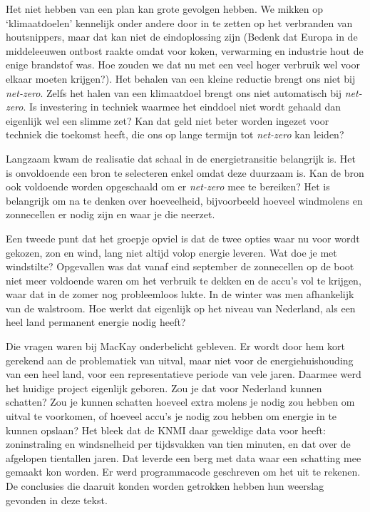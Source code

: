 \documentclass[
  11pt,
  a4paper,
]{book}
\begin{document}
Het niet hebben van een plan kan grote gevolgen hebben. We mikken op `klimaatdoelen' kennelijk onder andere door in te zetten op het verbranden van houtsnippers, maar dat kan niet de eindoplossing zijn (Bedenk dat Europa in de middeleeuwen ontbost raakte omdat voor koken, verwarming en industrie hout de enige brandstof was. Hoe zouden we dat nu met een veel hoger verbruik wel voor elkaar moeten krijgen?). Het behalen van een kleine reductie brengt ons niet bij \emph{net-zero}. Zelfs het halen van een klimaatdoel brengt ons niet automatisch bij \emph{net-zero}. Is investering in techniek waarmee het einddoel niet wordt gehaald dan eigenlijk wel een slimme zet? Kan dat geld niet beter worden ingezet voor techniek die toekomst heeft, die ons op lange termijn tot \emph{net-zero} kan leiden?

Langzaam kwam de realisatie dat schaal in de energietransitie belangrijk is. Het is onvoldoende een bron te selecteren enkel omdat deze duurzaam is. Kan de bron ook voldoende worden opgeschaald om er \emph{net-zero} mee te bereiken? Het is belangrijk om na te denken over hoeveelheid, bijvoorbeeld hoeveel windmolens en zonnecellen er nodig zijn en waar je die neerzet.

Een tweede punt dat het groepje opviel is dat de twee opties waar nu voor wordt gekozen, zon en wind, lang niet altijd volop energie leveren. Wat doe je met windstilte? Opgevallen was dat vanaf eind september de zonnecellen op de boot niet meer voldoende waren om het verbruik te dekken en de accu's vol te krijgen, waar dat in de zomer nog probleemloos lukte. In de winter was men afhankelijk van de walstroom. Hoe werkt dat eigenlijk op het niveau van Nederland, als een heel land permanent energie nodig heeft?

Die vragen waren bij MacKay onderbelicht gebleven. Er wordt door hem kort gerekend aan de problematiek van uitval, maar niet voor de energiehuishouding van een heel land, voor een representatieve periode van vele jaren. Daarmee werd het huidige project eigenlijk geboren. Zou je dat voor Nederland kunnen schatten? Zou je kunnen schatten hoeveel extra molens je nodig zou hebben om uitval te voorkomen, of hoeveel accu's je nodig zou hebben om energie in te kunnen opslaan? Het bleek dat de KNMI daar geweldige data voor heeft: zoninstraling en windsnelheid per tijdsvakken van tien minuten, en dat over de afgelopen tientallen jaren. Dat leverde een berg met data waar een schatting mee gemaakt kon worden. Er werd programmacode geschreven om het uit te rekenen. De conclusies die daaruit konden worden getrokken hebben hun weerslag gevonden in deze tekst.
\end{document}
